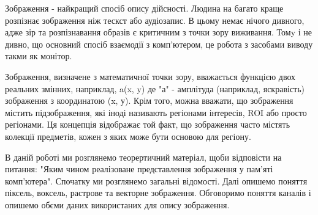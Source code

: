 \Introduction

Зображення - найкращий спосіб опису дійсності.
Людина на багато краще розпізнає зображення ніж тескст або аудіозапис.
В цьому немає нічого дивного, адже зір та розпізнавання образів є критичним з точки зору виживання.
Томy і не дивно, що основний спосіб взаємодії з комп'ютером, це робота з засобами виводу такми як монітор.

Зображення, визначене з математичної точки зору, вважається функцією двох реальних змінних, наприклад, a(x, y) де "а" - амплітуда (наприклад, яскравість) зображення з координатою (x, у).
Крім того, можна вважати, що зображення містить підзображення, які іноді називають регіонами інтересів, ROI або просто регіонами.
Ця концепція відображає той факт, що зображення часто містять колекції предметів, кожен з яких може бути основою для регіону.

В даній роботі ми розглянемо теорертичний матеріал, щоби відповісти на питання: "Яким чином реалізоване представлення зображення у пам'яті комп'ютера".
Спочатку ми розглянемо загальні відомості.
Далі опишемо поняття піксель, воксель, растрове та векторне зображення.
Обговоримо поняття каналів і опишемо обєми даних використаних для опису зображення.
